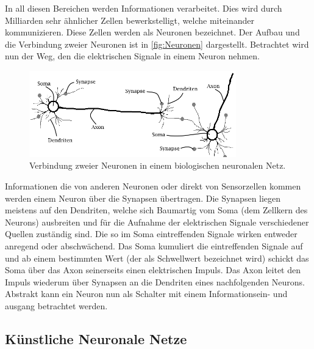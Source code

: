In all diesen Bereichen werden Informationen verarbeitet. Dies wird durch Milliarden sehr ähnlicher Zellen bewerkstelligt, welche miteinander kommunizieren. Diese Zellen werden als Neuronen bezeichnet. Der Aufbau und die Verbindung zweier Neuronen ist in \autoref{fig:Neuronen} dargestellt. Betrachtet wird nun der Weg, den die elektrischen Signale in einem Neuron nehmen.

\begin{figure}[!htb]
    \centering
        \includegraphics[width=0.8\textwidth]{Bilder/misc/Neuronen.png}
    \caption{Verbindung zweier Neuronen in einem biologischen neuronalen Netz.\protect\footnotemark{}}
    \label{fig:Neuronen}
\end{figure}
\addtocounter{footnote}{-1}     %
\addtocounter{Hfootnote}{-1}    %
\wrapfigfoot{}

Informationen die von anderen Neuronen oder direkt von Sensorzellen kommen werden einem Neuron über die Synapsen übertragen. Die Synapsen liegen meistens auf den Dendriten, welche sich Baumartig vom Soma (dem Zellkern des Neurons) ausbreiten und für die Aufnahme der elektrischen Signale verschiedener Quellen zuständig sind. Die so im Soma eintreffenden Signale wirken entweder anregend oder abschwächend. Das Soma kumuliert die eintreffenden Signale auf und ab einem bestimmten Wert (der als Schwellwert bezeichnet wird) schickt das Soma über das Axon seinerseits einen elektrischen Impuls. Das Axon leitet den Impuls wiederum über Synapsen an die Dendriten eines nachfolgenden Neurons. Abstrakt kann ein Neuron nun als Schalter mit einem Informationsein- und ausgang betrachtet werden.\, 


\subsection{Künstliche Neuronale Netze}\label{sec:einf_neuro}



